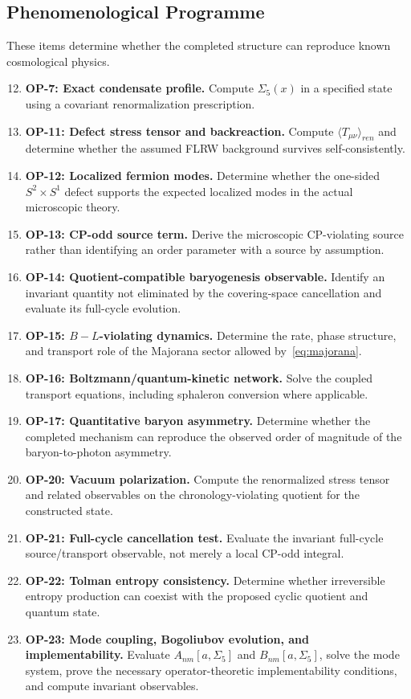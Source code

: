 \documentclass[11pt]{article}
\theoremstyle{canonmath}
\theoremstyle{canonpostulate}
\theoremstyle{canonclaim}
\def\mathrm#1{#1}%
\begin{document}
\subsection*{Phenomenological Programme}
These items determine whether the completed structure can reproduce known cosmological physics.

\begin{enumerate}
\setcounter{enumi}{11}
\item \textbf{OP-7: Exact condensate profile.} Compute $\Sigma_5(x)$ in a specified state using a covariant renormalization prescription.
\item \textbf{OP-11: Defect stress tensor and backreaction.} Compute $\langle T_{\mu\nu}\rangle_{\mathrm{ren}}$ and determine whether the assumed FLRW background survives self-consistently.
\item \textbf{OP-12: Localized fermion modes.} Determine whether the one-sided $S^2\times S^1$ defect supports the expected localized modes in the actual microscopic theory.
\item \textbf{OP-13: CP-odd source term.} Derive the microscopic CP-violating source rather than identifying an order parameter with a source by assumption.
\item \textbf{OP-14: Quotient-compatible baryogenesis observable.} Identify an invariant quantity not eliminated by the covering-space cancellation and evaluate its full-cycle evolution.
\item \textbf{OP-15: $B-L$-violating dynamics.} Determine the rate, phase structure, and transport role of the Majorana sector allowed by~\eqref{eq:majorana}.
\item \textbf{OP-16: Boltzmann/quantum-kinetic network.} Solve the coupled transport equations, including sphaleron conversion where applicable.
\item \textbf{OP-17: Quantitative baryon asymmetry.} Determine whether the completed mechanism can reproduce the observed order of magnitude of the baryon-to-photon asymmetry.
\item \textbf{OP-20: Vacuum polarization.} Compute the renormalized stress tensor and related observables on the chronology-violating quotient for the constructed state.
\item \textbf{OP-21: Full-cycle cancellation test.} Evaluate the invariant full-cycle source/transport observable, not merely a local CP-odd integral.
\item \textbf{OP-22: Tolman entropy consistency.} Determine whether irreversible entropy production can coexist with the proposed cyclic quotient and quantum state.
\item \textbf{OP-23: Mode coupling, Bogoliubov evolution, and implementability.} Evaluate $A_{nm}[a,\Sigma_5]$ and $B_{nm}[a,\Sigma_5]$, solve the mode system, prove the necessary operator-theoretic implementability conditions, and compute invariant observables.
\end{enumerate}
\end{document}
